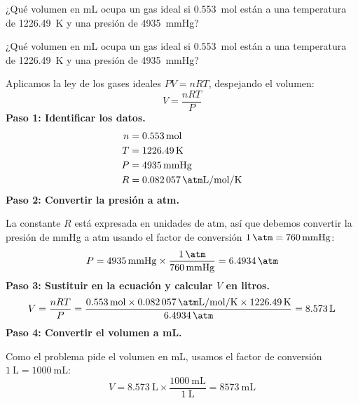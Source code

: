 \begin{exercise}
    ¿Qué volumen en mL ocupa un gas ideal si \qty{0.553}{\mol} están a una temperatura de \qty{1226.49}{\kelvin} y una presión de \qty{4935}{\mmHg}?
    \begin{solu}
        ¿Qué volumen en mL ocupa un gas ideal si \qty{0.553}{\mol} están a una temperatura de \qty{1226.49}{\kelvin} y una presión de \qty{4935}{\mmHg}?

        Aplicamos la ley de los gases ideales $PV = nRT$, despejando el volumen:
        \begin{equation*}
            V = \frac{nRT}{P}
        \end{equation*}
        \textbf{Paso 1: Identificar los datos.}
        \begin{align*}
            n &= \qty{0.553}{\mol} \\
            T &= \qty{1226.49}{\kelvin} \\
            P &= \qty{4935}{\mmHg} \\
            R &= \qty{0.082057}{\atm\liter\per\mol\per\kelvin}
        \end{align*}
        \textbf{Paso 2: Convertir la presión a atm.}

        La constante $R$ está expresada en unidades de atm, así que debemos convertir la presión de mmHg a atm usando el factor de conversión $\qty{1}{\atm} = \qty{760}{\mmHg}$:
        \begin{equation*}
            P = \qty{4935}{\mmHg} \times \frac{\qty{1}{\atm}}{\qty{760}{\mmHg}} = \qty{6.4934}{\atm}
        \end{equation*}
        \textbf{Paso 3: Sustituir en la ecuación y calcular $V$ en litros.}
        \begin{equation*}
            V = \frac{nRT}{P} = \frac{\qty{0.553}{\mol} \times \qty{0.082057}{\atm\liter\per\mol\per\kelvin} \times \qty{1226.49}{\kelvin}}{\qty{6.4934}{\atm}} = \qty{8.573}{\liter}
        \end{equation*}
        \textbf{Paso 4: Convertir el volumen a mL.}

        Como el problema pide el volumen en mL, usamos el factor de conversión $\qty{1}{\liter} = \qty{1000}{\mL}$:
        \begin{equation*}
            V = \qty{8.573}{\liter} \times \frac{\qty{1000}{\mL}}{\qty{1}{\liter}} = \boxed{\qty{8573}{\mL}}
        \end{equation*}
    \end{solu}
\end{exercise}
